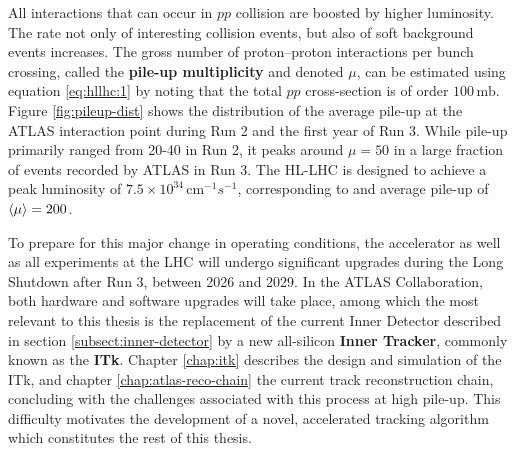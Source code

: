 All interactions that can occur in $pp$ collision are boosted by higher luminosity. 
The rate not only of interesting collision events, but also of soft background events increases.
The gross number of proton--proton interactions per bunch crossing, called the \textbf{pile-up multiplicity} and denoted $\mu$, can be estimated using equation \eqref{eq:hllhc:1} by noting that the total $pp$ cross-section is of order $100\,\mathrm{mb}$.
Figure \ref{fig:pileup-dist} shows the distribution of the average pile-up at the ATLAS interaction point during Run 2 and the first year of Run 3.
While pile-up primarily ranged from 20-40 in Run 2, it peaks around $\mu=50$ in a large fraction of events recorded by ATLAS in Run 3.
The HL-LHC is designed to achieve a peak luminosity of $7.5\times 10^{34} \, \mathrm{cm}^{-1}s^{-1} $, corresponding to and average pile-up of $\expval{\mu}=200$.

To prepare for this major change in operating conditions, the accelerator as well as all experiments at the LHC will undergo significant upgrades during the Long Shutdown after Run 3, between 2026 and 2029. 
In the ATLAS Collaboration, both hardware and software upgrades will take place, among which the most relevant to this thesis is the replacement of the current Inner Detector described in section \ref{subsect:inner-detector} by a new all-silicon \textbf{Inner Tracker}, commonly known as the \textbf{ITk}. 
Chapter \ref{chap:itk} describes the design and simulation of the ITk, and chapter \ref{chap:atlas-reco-chain} the current track reconstruction chain, concluding with the challenges associated with this process at high pile-up. 
This difficulty motivates the development of a novel, accelerated tracking algorithm which constitutes the rest of this thesis.





